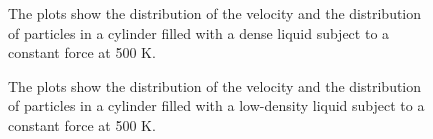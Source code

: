 \documentclass[12pt]{article}
\begin{document}
\begin{figure}[ht]
\centering
{}
\caption[Optional caption for list of figures]{The plots show the distribution of the velocity and the distribution of particles in a cylinder filled with a dense liquid subject to a constant force at 500 K.}
\label{fig:8}
\end{figure}
 
 \begin{figure}[ht]
\centering
{}
\caption[Optional caption for list of figures]{The plots show the distribution of the velocity and the distribution of particles in a cylinder filled with a low-density liquid subject to a constant force at 500 K.}
\label{fig:9}
\end{figure}
\end{document}
